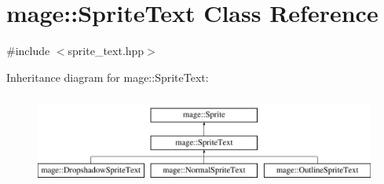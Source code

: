 \hypertarget{classmage_1_1_sprite_text}{}\section{mage\+:\+:Sprite\+Text Class Reference}
\label{classmage_1_1_sprite_text}


{\ttfamily \#include $<$sprite\+\_\+text.\+hpp$>$}

Inheritance diagram for mage\+:\+:Sprite\+Text\+:\begin{figure}[H]
\begin{center}
\leavevmode
\includegraphics[height=3.000000cm]{classmage_1_1_sprite_text}
\end{center}
\end{figure}
